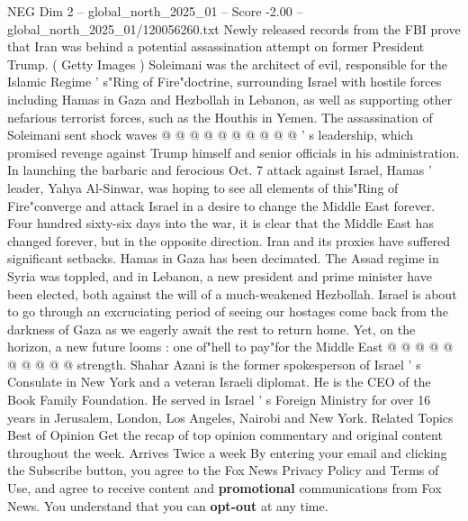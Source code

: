 \begin{textsample}{NEG Dim 2 – global\_north\_2025\_01 – Score -2.00 – global\_north\_2025\_01/120056260.txt}
Newly released records from the FBI prove that Iran was behind a potential assassination attempt on former President Trump. ( Getty Images ) Soleimani was the architect of evil, responsible for the Islamic Regime ' s"Ring of Fire"doctrine, surrounding Israel with hostile forces including Hamas in Gaza and Hezbollah in Lebanon, as well as supporting other nefarious terrorist forces, such as the Houthis in Yemen.
The assassination of Soleimani sent shock waves @ @ @ @ @ @ @ @ @ @ ' s leadership, which promised revenge against Trump himself and senior officials in his administration.
In launching the barbaric and ferocious Oct. 7 attack against Israel, Hamas ' leader, Yahya Al-Sinwar, was hoping to see all elements of this"Ring of Fire"converge and attack Israel in a desire to change the Middle East forever.
Four hundred sixty-six days into the war, it is clear that the Middle East has changed forever, but in the opposite direction.
Iran and its proxies have suffered significant setbacks.
Hamas in Gaza has been decimated.
The Assad regime in Syria was toppled, and in Lebanon, a new president and prime minister have been elected, both against the will of a much-weakened Hezbollah.
Israel is about to go through an excruciating period of seeing our hostages come back from the darkness of Gaza as we eagerly await the rest to return home.
Yet, on the horizon, a new future looms : one of"hell to pay"for the Middle East @ @ @ @ @ @ @ @ @ @ strength.
Shahar Azani is the former spokesperson of Israel ' s Consulate in New York and a veteran Israeli diplomat.
He is the CEO of the Book Family Foundation.
He served in Israel ' s Foreign Ministry for over 16 years in Jerusalem, London, Los Angeles, Nairobi and New York.
Related Topics Best of Opinion Get the recap of top opinion commentary and original content throughout the week.
Arrives Twice a week By entering your email and clicking the Subscribe button, you agree to the Fox News Privacy Policy and Terms of Use, and agree to receive content and \textbf{promotional} communications from Fox News.
You understand that you can \textbf{opt-out} at any time.

\end{textsample}
